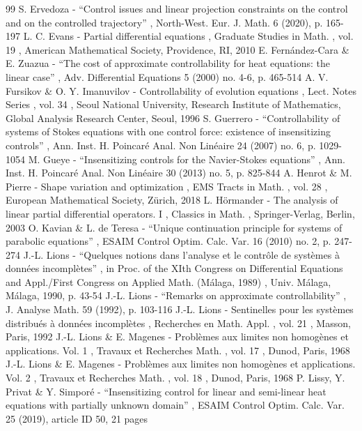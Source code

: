 \begin{thebibliography}{99}
 S. Ervedoza - “Control issues and linear projection constraints on the control and on the controlled trajectory” , North-West. Eur. J. Math. 6 (2020), p. 165-197
 L. C. Evans - Partial differential equations , Graduate Studies in Math. , vol. 19 , American Mathematical Society, Providence, RI, 2010
 E. Fernández-Cara \& E. Zuazua - “The cost of approximate controllability for heat equations: the linear case” , Adv. Differential Equations 5 (2000) no. 4-6, p. 465-514
 A. V. Fursikov \& O. Y. Imanuvilov - Controllability of evolution equations , Lect. Notes Series , vol. 34 , Seoul National University, Research Institute of Mathematics, Global Analysis Research Center, Seoul, 1996
 S. Guerrero - “Controllability of systems of Stokes equations with one control force: existence of insensitizing controls” , Ann. Inst. H. Poincaré Anal. Non Linéaire 24 (2007) no. 6, p. 1029-1054
 M. Gueye - “Insensitizing controls for the Navier-Stokes equations” , Ann. Inst. H. Poincaré Anal. Non Linéaire 30 (2013) no. 5, p. 825-844
 A. Henrot \& M. Pierre - Shape variation and optimization , EMS Tracts in Math. , vol. 28 , European Mathematical Society, Zürich, 2018
 L. Hörmander - The analysis of linear partial differential operators. I , Classics in Math. , Springer-Verlag, Berlin, 2003
 O. Kavian \& L. de Teresa - “Unique continuation principle for systems of parabolic equations” , ESAIM Control Optim. Calc. Var. 16 (2010) no. 2, p. 247-274
 J.-L. Lions - “Quelques notions dans l’analyse et le contrôle de systèmes à données incomplètes” , in Proc. of the XIth Congress on Differential Equations and Appl./First Congress on Applied Math. (Málaga, 1989) , Univ. Málaga, Málaga, 1990, p. 43-54
 J.-L. Lions - “Remarks on approximate controllability” , J. Analyse Math. 59 (1992), p. 103-116
 J.-L. Lions - Sentinelles pour les systèmes distribués à données incomplètes , Recherches en Math. Appl. , vol. 21 , Masson, Paris, 1992
 J.-L. Lions \& E. Magenes - Problèmes aux limites non homogènes et applications. Vol. 1 , Travaux et Recherches Math. , vol. 17 , Dunod, Paris, 1968
 J.-L. Lions \& E. Magenes - Problèmes aux limites non homogènes et applications. Vol. 2 , Travaux et Recherches Math. , vol. 18 , Dunod, Paris, 1968
 P. Lissy, Y. Privat \& Y. Simporé - “Insensitizing control for linear and semi-linear heat equations with partially unknown domain” , ESAIM Control Optim. Calc. Var. 25 (2019), article ID 50, 21 pages

\end{thebibliography}
